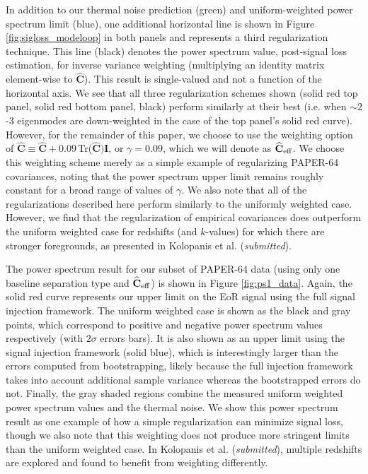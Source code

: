 \documentclass[preprint2,numberedappendix,tighten]{aastex6}  %
\begin{document}
In addition to our thermal noise prediction (green) and uniform-weighted power spectrum limit (blue), one additional horizontal line is shown in Figure \ref{fig:sigloss_modeloop} 
in both panels and represents a third regularization technique. This line (black) denotes the power spectrum value, post-signal loss estimation, for inverse variance weighting (multiplying an identity 
matrix element-wise to $\widehat{\textbf{C}}$). This result is single-valued and not a function of the horizontal axis. We see that all three regularization schemes shown (solid red top panel, solid red bottom panel, black) perform similarly at 
their best (i.e. when $\sim2$-$3$ eigenmodes are down-weighted in the case of the top panel's solid red curve). However, for the remainder of this paper, we choose to use the weighting option of $\widehat{\textbf{C}} \equiv \widehat{\textbf{C}} + 0.09 \,$Tr($\widehat{\textbf{C}})\textbf{I}$, or $\gamma = 0.09$, which we will denote as $\widehat{\textbf{C}}_{\rm eff}$. We choose this weighting scheme merely as a simple example of regularizing PAPER-64 covariances, noting that the power spectrum upper limit remains roughly constant for a broad range of values of $\gamma$. We also note that all of the regularizations described here perform similarly to the uniformly weighted case. However, we find that the regularization of empirical covariances does outperform the uniform weighted case for redshifts (and $k$-values) for which there are stronger foregrounds, as presented in Kolopanis et al. (\textit{submitted}).

The power spectrum result for our subset of PAPER-64 data (using only one baseline separation type and $\widehat{\textbf{C}}_{\rm eff}$) is shown in Figure 
\ref{fig:ps1_data}. Again, the solid red curve represents our upper limit on the EoR signal using the full signal injection framework. The uniform weighted case is shown as the black and gray points, which correspond to positive and negative power spectrum values respectively (with 
$2\sigma$ errors bars). It is also shown as an upper limit using the signal injection framework (solid blue), which is interestingly larger than the errors computed from bootstrapping, likely because the full injection framework takes into account additional sample variance whereas the bootstrapped errors do not. Finally, the gray shaded regions combine the measured uniform weighted power spectrum values and the thermal noise. We show this power spectrum result as one example of how a simple regularization can minimize signal loss, though we also note that this weighting does not produce more stringent limits than the uniform weighted case. In Kolopanis et al. (\textit{submitted}), multiple redshifts are explored and found to benefit from weighting differently.
\end{document}
